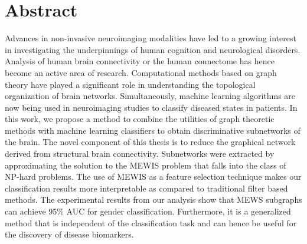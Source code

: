 \documentclass[msthesis.tex]{subfiles}
\begin{document}
\chapter{Abstract}
\thispagestyle{empty}

Advances in non-invasive neuroimaging modalities have led to a growing interest in investigating the underpinnings of human cognition and neurological disorders. Analysis of human brain connectivity or the human connectome has hence become an active area of research. Computational methods based on graph theory have played a significant role in understanding the topological organization of brain networks. Simultaneously, machine learning algorithms are now being used in neuroimaging studies to classify diseased states in patients. In this work, we propose a method to combine the utilities of graph theoretic methods with machine learning classifiers to obtain discriminative subnetworks of the brain. The novel component of this thesis is to reduce the graphical network derived from structural brain connectivity. Subnetworks were extracted by approximating the solution to the \gls{MEWIS} problem that falls into the class of NP-hard problems. The use of \gls{MEWIS} as a feature selection technique makes our classification results more interpretable as compared to traditional filter based methods. The experimental results from our analysis show that MEWS subgraphs can achieve 95\% \gls{AUC} for gender classification. Furthermore, it is a generalized method that is independent of the classification task and can hence be useful for the discovery of disease biomarkers.
\end{document}
